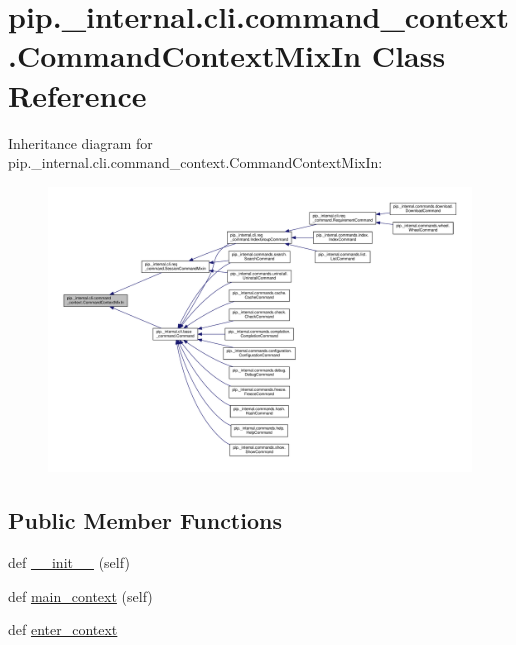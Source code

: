 \hypertarget{classpip_1_1__internal_1_1cli_1_1command__context_1_1CommandContextMixIn}{}\section{pip.\+\_\+internal.\+cli.\+command\+\_\+context.\+Command\+Context\+Mix\+In Class Reference}
\label{classpip_1_1__internal_1_1cli_1_1command__context_1_1CommandContextMixIn}


Inheritance diagram for pip.\+\_\+internal.\+cli.\+command\+\_\+context.\+Command\+Context\+Mix\+In\+:
\nopagebreak
\begin{figure}[H]
\begin{center}
\leavevmode
\includegraphics[width=350pt]{classpip_1_1__internal_1_1cli_1_1command__context_1_1CommandContextMixIn__inherit__graph}
\end{center}
\end{figure}
\subsection*{Public Member Functions}
\begin{DoxyCompactItemize}
\item 
def \hyperlink{classpip_1_1__internal_1_1cli_1_1command__context_1_1CommandContextMixIn_ad5be5a6685a47633a96c4b8090b8a092}{\+\_\+\+\_\+init\+\_\+\+\_\+} (self)
\item 
def \hyperlink{classpip_1_1__internal_1_1cli_1_1command__context_1_1CommandContextMixIn_a71a6ab2ee5692a5c2122ebfb4e293b96}{main\+\_\+context} (self)
\item 
def \hyperlink{classpip_1_1__internal_1_1cli_1_1command__context_1_1CommandContextMixIn_a96d5ddc0b96bd8ed60dded1e761add77}{enter\+\_\+context}
\end{DoxyCompactItemize}


